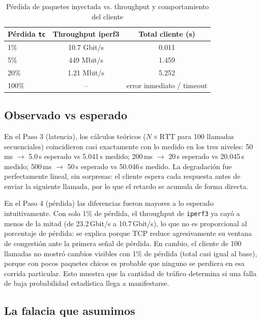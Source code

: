 \begin{table}[h]
\centering
\begin{tabular}{|l|c|c|}
\hline
\textbf{Pérdida \texttt{tc}} & \textbf{Throughput iperf3} & \textbf{Total cliente (s)} \\
\hline
1\%   & 10.7 Gbit/s & 0.011 \\
5\%   & 449 Mbit/s  & 1.459 \\
20\%  & 1.21 Mbit/s & 5.252 \\
100\% & --          & error inmediato / timeout \\
\hline
\end{tabular}
\caption{Pérdida de paquetes inyectada vs. throughput y comportamiento del cliente}
\end{table}


\subsection{Observado vs esperado}

En el Paso 3 (latencia), los cálculos teóricos ($N \times \text{RTT}$ para
100 llamadas secuenciales) coincidieron casi exactamente con lo medido en
los tres niveles: 50\,ms $\rightarrow$ 5.0\,s esperado vs 5.041\,s medido;
200\,ms $\rightarrow$ 20\,s esperado vs 20.045\,s medido; 500\,ms
$\rightarrow$ 50\,s esperado vs 50.046\,s medido. La degradación fue
perfectamente lineal, sin sorpresas: el cliente espera cada respuesta antes
de enviar la siguiente llamada, por lo que el retardo se acumula de forma
directa.

En el Paso 4 (pérdida) las diferencias fueron mayores a lo esperado
intuitivamente. Con solo 1\% de pérdida, el throughput de \texttt{iperf3}
ya cayó a menos de la mitad (de 23.2\,Gbit/s a 10.7\,Gbit/s), lo que no es
proporcional al porcentaje de pérdida: se explica porque TCP reduce
agresivamente su ventana de congestión ante la primera señal de pérdida.
En cambio, el cliente de 100 llamadas no mostró cambios visibles con 1\% de
pérdida (total casi igual al base), porque con pocos paquetes chicos es
probable que ninguno se perdiera en esa corrida particular. Esto muestra
que la cantidad de tráfico determina si una falla de baja probabilidad
estadística llega a manifestarse.

\subsection{La falacia que asumimos}


